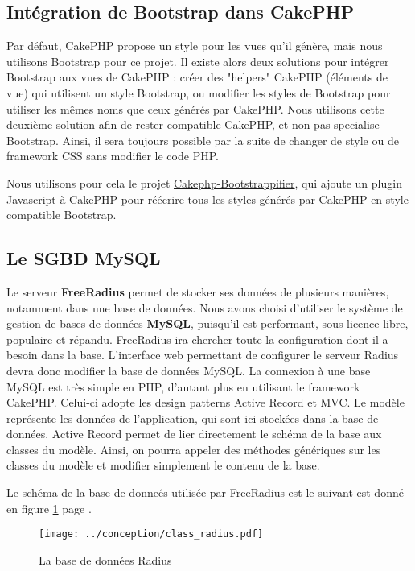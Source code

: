 \subsection{Intégration de Bootstrap dans CakePHP}

Par défaut, CakePHP propose un style pour les vues qu'il génère, mais nous utilisons Bootstrap pour ce projet.
Il existe alors deux solutions pour intégrer Bootstrap aux vues de CakePHP : créer des "helpers" CakePHP (éléments de vue) qui utilisent un style Bootstrap, ou modifier les styles de Bootstrap pour utiliser les mêmes noms que ceux générés par CakePHP.
Nous utilisons cette deuxième solution afin de rester compatible CakePHP, et non pas specialise Bootstrap. Ainsi, il sera toujours possible par la suite de changer de style ou de framework CSS sans modifier le code PHP.

Nous utilisons pour cela le projet \href{https://github.com/mtkocak/Cakephp-Bootstrappifier}{Cakephp-Bootstrappifier}, qui ajoute un plugin Javascript à CakePHP pour réécrire tous les styles générés par CakePHP en style compatible Bootstrap.

\subsection{Le SGBD MySQL}

Le serveur \textbf{FreeRadius} permet de stocker ses données de plusieurs manières, notamment dans une base de données. Nous avons choisi d'utiliser le système de gestion de bases de données \textbf{MySQL}, puisqu'il est performant, sous licence libre, populaire et répandu. FreeRadius ira chercher toute la configuration dont il a besoin dans la base. L'interface web permettant de configurer le serveur Radius devra donc modifier la base de données MySQL.
La connexion à une base MySQL est très simple en PHP, d'autant plus en utilisant le framework CakePHP. Celui-ci adopte les design patterns Active Record et MVC. Le modèle représente les données de l'application, qui sont ici stockées dans la base de données. Active Record permet de lier directement le schéma de la base aux classes du modèle. Ainsi, on pourra appeler des méthodes génériques sur les classes du modèle et modifier simplement le contenu de la base.

Le schéma de la base de donneés utilisée par FreeRadius est le suivant est donné en figure \ref{class_radius} page \pageref{class_radius}.

\begin{figure}[!ht]
\texttt{[image: ../conception/class\_radius.pdf]}
\label{class_radius}
\caption{La base de données Radius}
\end{figure}
